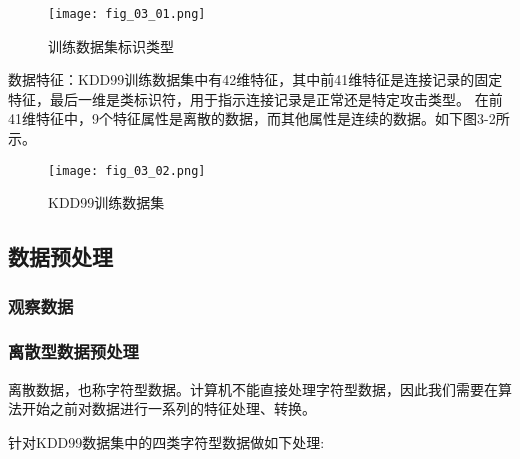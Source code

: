 \begin{figure}[h]  %
	\centering
	\texttt{[image: fig\_03\_01.png]}
	\caption{训练数据集标识类型}
	\label{}
\end{figure}
数据特征：KDD99训练数据集中有42维特征，其中前41维特征是连接记录的固定特征，最后一维是类标识符，用于指示连接记录是正常还是特定攻击类型。 在前41维特征中，9个特征属性是离散的数据，而其他属性是连续的数据。如下图3-2所示。

\begin{figure}[h]
	\centering
	\texttt{[image: fig\_03\_02.png]}
	\caption{KDD99训练数据集}
	\label{}
\end{figure}

\subsection{数据预处理}
\subsubsection{观察数据}
\subsubsection{离散型数据预处理}
离散数据，也称字符型数据。计算机不能直接处理字符型数据，因此我们需要在算法开始之前对数据进行一系列的特征处理、转换。

针对KDD99数据集中的四类字符型数据做如下处理:

